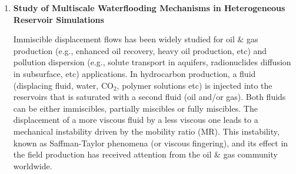 \documentclass[12pts,a4paper,amsmath,amssymb,floatfix]{article}%
\newcommand{\all}{MSc O$\&$GE, PetE, UG Chem/Mech/Pet Engineering}
\begin{document}
\begin{enumerate}[label=\bfseries Project: \arabic*:]
\noindent
{\bf Specifics:} 
\begin{enumerate}
\item Computational, theoretical and review (\all) -- 1 student. 
\item The student is required to develop an initial thermodynamic solid-liquid-vapour equilibrium (SLVE) formulation;
\item This formulation will be `translated' into a code (e.g., Matlab, Python etc) and coupled with a optimisation software to assess its initial reliability/accuracy.
\end{enumerate}

{\bf References:}
\begin{itemize}
\item Ahmadi et al. (2007) `Natural gas production from hydrate dissociation: An axisymmetric model', Journal of Petroleum Science and Engineering, 58:245-258;
\item Sloan (1998) `Clathrate Hydrates of Natural Gases', M. Dekker (Publisher);
\item Jager et al. (2003) `The next generation of hydrate prediction - II. Dedicated aqueous phase fugacity model for hydrate prediction', Fluid Phase Equilibria, 211:85-107;
\item Carrol (2003) `Natural Gas Hydrates: A Guide for Engineers', Gulf Professional Publishing.
\end{itemize}

\clearpage

\item {\bf Study of Multiscale Waterflooding Mechanisms in Heterogeneous Reservoir Simulations}

Immiscible displacement flows has been widely studied for oil $\&$ gas production (e.g., enhanced oil recovery, heavy oil production, etc) and pollution dispersion (e.g., solute transport in aquifers, radionuclides diffusion in subsurface, etc) applications. In hydrocarbon production, a fluid (displacing fluid, water, CO$_{2}$, polymer solutions etc) is injected into the reservoirs that is saturated with a second fluid (oil and/or gas). Both fluids can be either immiscibles, partially miscibles or fully miscibles. The displacement of a more viscous fluid by a less viscous one leads to a mechanical instability driven by the mobility ratio (MR). This instability, known as Saffman-Taylor phenomena (or viscous fingering), and its effect in the field production has received attention from the oil $\&$ gas community worldwide.


\end{enumerate}
\end{document}

